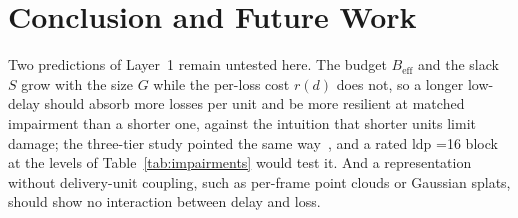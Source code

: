 \section{Conclusion and Future Work}
\label{sec:conclusion}
 Two predictions of Layer~1 remain untested here. The
budget $B_{\mathrm{eff}}$ and the slack $S$ grow with the \gof size
$G$ while the per-loss cost $r(d)$ does not, so a longer low-delay
\gof should absorb more losses per unit and be more resilient at
matched impairment than a shorter one, against the intuition that
shorter units limit damage; the three-tier study pointed the same
way~\cite{mosaic2026}, and a rated \gls{ldp} \gof{}=16 block at the
levels of Table~\ref{tab:impairments} would test it. And a
representation without delivery-unit coupling, such as per-frame
point clouds or Gaussian splats, should show no interaction between
delay and loss. 
